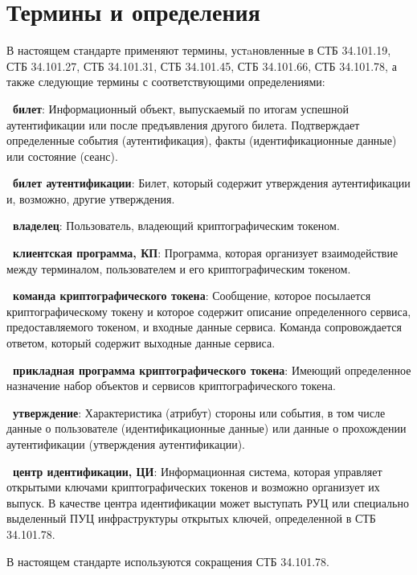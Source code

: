 \chapter{Термины и определения}

В настоящем стандарте применяют термины, устaновленные 
в СТБ 34.101.19, СТБ 34.101.27, СТБ 34.101.31, СТБ 34.101.45, 
СТБ 34.101.66, СТБ 34.101.78, а также следующие термины с 
соответствующими определениями: 

{\bf \thedefctr~билет}:
Информационный объект, выпускаемый по итогам успешной аутентификации
или после предъявления другого билета. Подтверждает определенные 
события (аутентификация), факты (идентификационные данные) 
или состояние (сеанс). 

{\bf \thedefctr~билет аутентификации}:
Билет, который содержит утверждения аутентификации и, возможно, другие 
утверждения. 

{\bf \thedefctr~владелец}:
Пользователь, владеющий криптографическим токеном.

{\bf \thedefctr~клиентская программа, КП}:
Программа, которая организует взаимодействие между терминалом, 
пользователем и его криптографическим токеном.

{\bf \thedefctr~команда криптографического токена}:
Сообщение, которое посылается 
криптографическому токену и которое содержит описание определенного 
сервиса, предоставляемого токеном, и входные данные сервиса. Команда 
сопровождается ответом, который содержит выходные данные сервиса. 

{\bf \thedefctr~прикладная программа криптографического токена}:
Имеющий определенное 
назначение набор объектов и сервисов криптографического токена. 

{\bf \thedefctr~утверждение}:
Характеристика (атрибут) стороны или события, 
в том числе данные о пользователе (идентификационные данные) 
или данные о прохождении аутентификации (утверждения аутентификации).


{\bf \thedefctr~центр идентификации, ЦИ}:
Информационная система, которая управляет открытыми ключами
криптографических токенов и возможно организует их выпуск.
%
В качестве центра идентификации может выступать РУЦ или специально  
выделенный ПУЦ инфраструктуры открытых ключей, определенной в СТБ 
34.101.78.

В настоящем стандарте используются сокращения СТБ 34.101.78.

